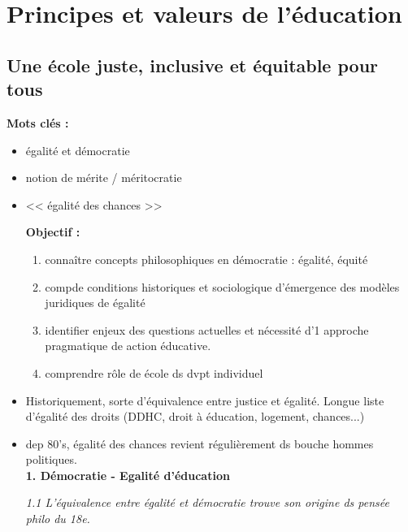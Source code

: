 \documentclass[12pt]{report}
\begin{document}
\tableofcontents

\part{Principes et valeurs de l'éducation}

\chapter{Une école juste, inclusive et équitable pour tous}

\textbf{Mots clés : }
\begin{itemize}
\item égalité et démocratie
\item notion de mérite / méritocratie
\item << égalité des chances >>

\vspace{0.5cm}

\textbf{Objectif :}


\begin{enumerate}
\item connaître concepts philosophiques en démocratie : égalité, équité
\item compde conditions historiques et sociologique d'émergence des modèles juridiques de égalité
\item identifier enjeux des questions actuelles et nécessité d'1 approche pragmatique de action éducative.
\item comprendre rôle de école ds dvpt individuel \\
\end{enumerate}

\item Historiquement, sorte d'équivalence entre justice et égalité. Longue liste d'égalité des droits (DDHC, droit à éducation, logement, chances...)\\

\item dep 80's, égalité des chances revient régulièrement ds bouche hommes politiques. \\

\textbf{1. Démocratie - Egalité d'éducation}
 
\textit{1.1 L'équivalence entre égalité et démocratie trouve son origine ds pensée philo du 18e.} \\


\end{itemize}
\end{document}
